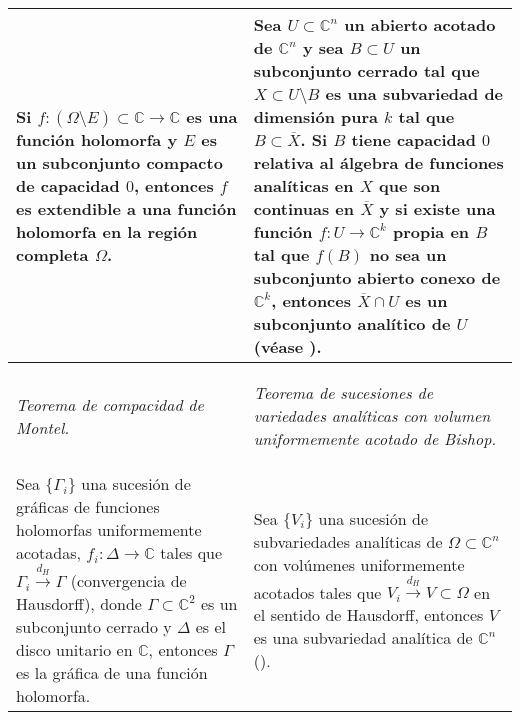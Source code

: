 \documentclass{article}
\newcommand{\co}{\ensuremath{\mathbb C }}
\newcommand{\con}{\ensuremath{\mathbb{C}^n}}
\begin{document}
\begin{table}[hpt]
\begin{tabular}{|m{5.5cm}|m{5.5cm}|}
                        \hline Si $f:(\Omega\setminus E)\subset\co\rightarrow\co$ es una funci\'on holomorfa y $E$ es un subconjunto
                        compacto de capacidad $0$, entonces $f$ es extendible a una funci\'on holomorfa
                        en la regi\'on completa $\Omega$.
                        &
                        \vspace{0.1cm}
                        Sea $U\subset\con$ un abierto acotado de $\con$ y sea $B\subset U$ un subconjunto cerrado
                        tal que $X\subset U\setminus B$ es una subvariedad de dimensi\'on pura $k$ tal que $B\subset\overline{X}$. 
                        Si $B$ tiene capacidad $0$ relativa al \'algebra de funciones anal\'iticas en $X$ que son
                        continuas en $\overline{X}$ y si existe una funci\'on $f:U\rightarrow\co^k$ propia en $B$ tal que $f(B)$ 
                        no sea un subconjunto abierto conexo de $\co^k$, entonces $\overline{X}\cap U$ es un subconjunto anal\'itico
                        de $U$ (v\'ease \cite[teorema 4]{Bishop}).\\ 
                        \hline 
                \begin{center} 
                        \textit{Teorema de compacidad de Montel.}
                \end{center} 
                        & 
                \begin{center}
                        \textit{Teorema de sucesiones de variedades anal\'iticas con volumen uniformemente acotado de Bishop.}
                \end{center}\\
                \hline 
                \vspace{0.1cm}
                Sea $\lbrace\Gamma_i\rbrace$ una sucesi\'on de gr\'aficas de funciones holomorfas uniformemente  
                acotadas, $f_i:\Delta\rightarrow\co$ tales que $\Gamma_i\overset{d_H}\longrightarrow\Gamma$ (convergencia de Hausdorff), 
                donde $\Gamma\subset\co^2$ es un subconjunto cerrado y $\Delta$ es el disco unitario en $\co$, 
                entonces $\Gamma$ es la gr\'afica de una funci\'on holomorfa.  
                        & 
                Sea $\lbrace V_i\rbrace$ una sucesi\'on de subvariedades anal\'iticas de $\Omega\subset\con$ con vol\'umenes 
                uniformemente acotados tales que $V_i\overset{d_H}\longrightarrow V\subset\Omega$ en el sentido de Hausdorff, entonces 
                $V$ es una subvariedad anal\'itica de $\con$ (\cite[p. 30]{Stolzenberg}). \\ \hline         
        \end{tabular} 
\end{table}
\end{document}
